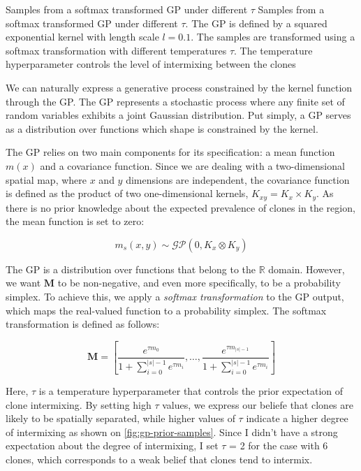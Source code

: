     {Samples from a softmax transformed \ac{GP} under different $\tau$}
    {Samples from a softmax transformed \ac{GP} under different $\tau$. The \ac{GP} is defined by a squared exponential kernel with length scale $l=0.1$. The samples are transformed using a softmax transformation with different temperatures $\tau$. The temperature hyperparameter controls the level of intermixing between the clones}


We can naturally express a generative process constrained by the kernel function through the \acf{GP}. The \ac{GP} represents a stochastic process where any finite set of random variables exhibits a joint Gaussian distribution. Put simply, a \ac{GP} serves as a distribution over functions which shape is constrained by the kernel. 

The \ac{GP} relies on two main components for its specification: a mean function $m(x)$ and a covariance function. Since we are dealing with a two-dimensional spatial map, where $x$ and $y$ dimensions are independent, the covariance function is defined as the product of two one-dimensional kernels, $K_{xy} = K_x \times K_y$. As there is no prior knowledge about the expected prevalence of clones in the region, the mean function is set to zero:

\begin{equation}
    m_s(x,y) \sim \mathcal{GP}(0, K_x \otimes K_y)
\end{equation}

The \ac{GP} is a distribution over functions that belong to the $\mathbb{R}$ domain. However, 
we want $\mathbf{M}$ to be non-negative, and even more specifically, to be a probability simplex. To achieve this, we apply a \emph{softmax transformation} to the \ac{GP} output, which maps the real-valued function to a probability simplex. The softmax transformation is defined as follows:

\begin{equation}
    \mathbf{M} = \left[ \dfrac{e^{\tau m_0}}{1 + \sum_{i=0}^{|s|-1}{e^{\tau m_i}}}, \dots, \dfrac{e^{\tau m_{|s|-1}}}{1 + \sum_{i=0}^{|s|-1}{e^{\tau m_i}}} \right]
\end{equation}

Here, $\tau$ is a temperature hyperparameter that controls the prior expectation of clone intermixing. By setting high $\tau$ values, we express our beliefe that clones are likely to be spatially separated, while higher values of $\tau$ indicate a higher degree of intermixing as shown on \cref{fig:gp-prior-samples}. Since I didn't have a strong expectation about the degree of intermixing, I set $\tau$ = 2 for the case with 6 clones, which corresponds to a weak belief that clones tend to intermix.

